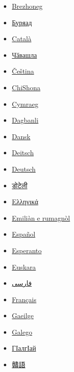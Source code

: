 \documentclass[11pt,a4paper]{article}
\begin{document}
\begin{itemize}
\item \href{https://br.wikipedia.org/wiki/Houad\_(evn)}{Brezhoneg}
\item \href{https://bxr.wikipedia.org/wiki/\%D0\%9D\%D1\%83\%D0\%B3\%D0\%B0h\%D0\%B0\%D0\%BD}{Буряад}
\item \href{https://ca.wikipedia.org/wiki/\%C3\%80necs}{Català}
\item \href{https://cv.wikipedia.org/wiki/\%D0\%9A\%C4\%83\%D0\%B2\%D0\%B0\%D0\%BA\%D0\%B0\%D0\%BB\%D1\%81\%D0\%B5\%D0\%BC}{Чӑвашла}
\item \href{https://cs.wikipedia.org/wiki/Kachna}{Čeština}
\item \href{https://sn.wikipedia.org/wiki/Dhadha}{ChiShona}
\item \href{https://cy.wikipedia.org/wiki/Hwyaden}{Cymraeg}
\item \href{https://dag.wikipedia.org/wiki/Gbunya\%C9\%A3u}{Dagbanli}
\item \href{https://da.wikipedia.org/wiki/\%C3\%86nder}{Dansk}
\item \href{https://pdc.wikipedia.org/wiki/Ent}{Deitsch}
\item \href{https://de.wikipedia.org/wiki/Enten}{Deutsch}
\item \href{https://dty.wikipedia.org/wiki/\%E0\%A4\%B9\%E0\%A4\%BE\%E0\%A4\%81\%E0\%A4\%B8}{डोटेली}
\item \href{https://el.wikipedia.org/wiki/\%CE\%A0\%CE\%AC\%CF\%80\%CE\%B9\%CE\%B1}{Ελληνικά}
\item \href{https://eml.wikipedia.org/wiki/An\%C3\%A0dra}{Emiliàn e rumagnòl}
\item \href{https://es.wikipedia.org/wiki/Pato}{Español}
\item \href{https://eo.wikipedia.org/wiki/Anaso}{Esperanto}
\item \href{https://eu.wikipedia.org/wiki/Ahate}{Euskara}
\item \href{https://fa.wikipedia.org/wiki/\%D9\%85\%D8\%B1\%D8\%BA\%D8\%A7\%D8\%A8\%DB\%8C}{فارسی}
\item \href{https://fr.wikipedia.org/wiki/Canard}{Français}
\item \href{https://ga.wikipedia.org/wiki/Lacha}{Gaeilge}
\item \href{https://gl.wikipedia.org/wiki/Pato}{Galego}
\item \href{https://inh.wikipedia.org/wiki/\%D0\%91\%D0\%BE\%D0\%B0\%D0\%B1\%D0\%B0\%D1\%88\%D0\%BA\%D0\%B0\%D1\%88}{ГӀалгӀай}
\item \href{https://gan.wikipedia.org/wiki/\%E9\%B4\%A8}{贛語}

\end{itemize}
\end{document}
